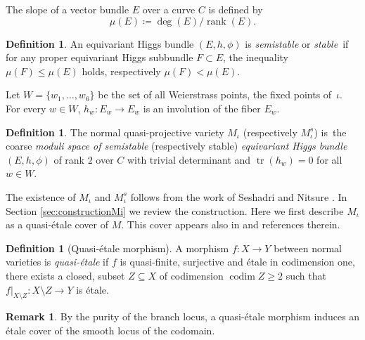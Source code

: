 \documentclass[JEP,XML,SOM,Unicode, NoEqCountersInSection,NoFloatCountersInSection,published]{cedram}
\theoremstyle{definition}
\newtheorem{defn}[thm]{Definition}
\newtheorem{rmk}[thm]{Remark}
\newcommand{\codim}{\operatorname{codim}}
\newcommand{\rank}{\operatorname{rank}}
\newcommand{\Tr}{\operatorname{tr}}
\begin{document}
The slope of a vector bundle $E$ over a curve $C$ is defined by
\[
\mu(E)\coloneqq \deg(E)/\rank(E).
\]

\begin{defn}
An equivariant Higgs bundle $(E, h, \phi)$ is \emph{semistable} or \emph{stable}~if for any proper equivariant Higgs subbundle $F \subset E$, the inequality $\mu(F)\leq \mu(E)$ holds, respectively $\mu(F)< \mu(E)$.
\end{defn}
Let $W = \{w_1, \ldots, w_6\}$ be the set of all Weierstrass points, \ie the fixed points of~$\iota$. For every $w \in W$, $h_w\colon E_w \to E_w$ is an involution of the fiber $E_w$.
\begin{defn}
The normal quasi-projective variety $M_{\iota}$ (respectively $M^{s}_{\iota}$) is~the coarse \emph{moduli space of semistable} (respectively stable) \emph{equivariant Higgs bundle} $(E, h, \phi)$ of rank $2$ over $C$ with trivial determinant and $\Tr(h_{w})=0$ for all $w \in W$.
\end{defn}
The existence of $M_{\iota}$ and $M^{s}_{\iota}$ follows from the work of Seshadri \cite{Seshadri70} and Nitsure \cite{Nitsure91}. In Section \ref{sec:constructionMi} we review the construction. Here we first describe $M_{\iota}$ as a quasi-étale cover of $M$. This cover appears also in \cite[\S 6.3]{HeuLoray19} and references therein.

\begin{defn}[Quasi-étale morphism]
A morphism $f\colon X \to Y$ between normal varieties is \emph{quasi-étale} if $f$ is quasi-finite, surjective and étale in codimension one, \ie there exists a closed, subset $Z \subseteq X$ of codimension $\codim Z \geq 2$ such that $f|_{X \setminus Z}\colon X \setminus Z \to Y$ is étale.
\end{defn}
\begin{rmk}\label{rmk:purity}
By the purity of the branch locus, a quasi-étale morphism induces an étale cover of the smooth locus of the codomain.
\end{rmk}
\end{document}
